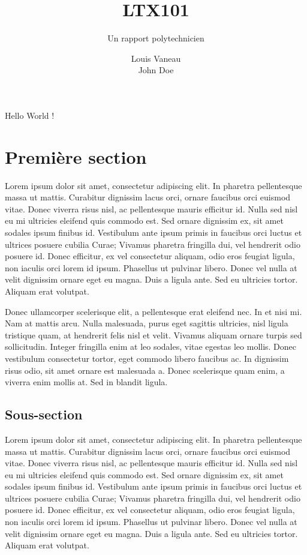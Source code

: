 \documentclass[a4paper, 11pt,twoside]{article} %
\title{LTX101}
\subtitle{Un rapport polytechnicien}
\author{Louis Vaneau \\ John Doe}
\begin{document}
\maketitle

\tableofcontents


\clearpage
Hello World !

\section{Première section}

  Lorem ipsum dolor sit amet, consectetur adipiscing elit. In pharetra pellentesque massa ut mattis. Curabitur dignissim lacus orci, ornare faucibus orci euismod vitae. Donec viverra risus nisl, ac pellentesque mauris efficitur id. Nulla sed nisl eu mi ultricies eleifend quis commodo est. Sed ornare dignissim ex, sit amet sodales ipsum finibus id. Vestibulum ante ipsum primis in faucibus orci luctus et ultrices posuere cubilia Curae; Vivamus pharetra fringilla dui, vel hendrerit odio posuere id. Donec efficitur, ex vel consectetur aliquam, odio eros feugiat ligula, non iaculis orci lorem id ipsum. Phasellus ut pulvinar libero. Donec vel nulla at velit dignissim ornare eget eu magna. Duis a ligula ante. Sed eu ultricies tortor. Aliquam erat volutpat.

  Donec ullamcorper scelerisque elit, a pellentesque erat eleifend nec. In et nisi mi. Nam at mattis arcu. Nulla malesuada, purus eget sagittis ultricies, nisl ligula tristique quam, at hendrerit felis nisl et velit. Vivamus aliquam ornare turpis sed sollicitudin. Integer fringilla enim at leo sodales, vitae egestas leo mollis. Donec vestibulum consectetur tortor, eget commodo libero faucibus ac. In dignissim risus odio, sit amet ornare est malesuada a. Donec scelerisque quam enim, a viverra enim mollis at. Sed in blandit ligula. 

  \subsection{Sous-section}

  Lorem ipsum dolor sit amet, consectetur adipiscing elit. In pharetra pellentesque massa ut mattis. Curabitur dignissim lacus orci, ornare faucibus orci euismod vitae. Donec viverra risus nisl, ac pellentesque mauris efficitur id. Nulla sed nisl eu mi ultricies eleifend quis commodo est. Sed ornare dignissim ex, sit amet sodales ipsum finibus id. Vestibulum ante ipsum primis in faucibus orci luctus et ultrices posuere cubilia Curae; Vivamus pharetra fringilla dui, vel hendrerit odio posuere id. Donec efficitur, ex vel consectetur aliquam, odio eros feugiat ligula, non iaculis orci lorem id ipsum. Phasellus ut pulvinar libero. Donec vel nulla at velit dignissim ornare eget eu magna. Duis a ligula ante. Sed eu ultricies tortor. Aliquam erat volutpat.
\end{document}
